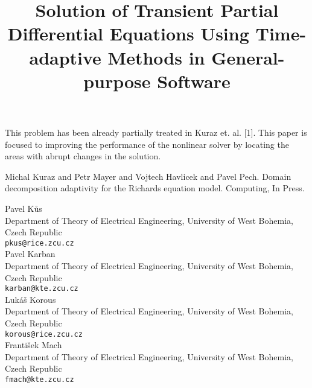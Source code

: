 \documentclass[article,A4,11pt]{llncs}%
\begin{document}
This problem has been already partially treated in Kuraz et. al. [1]. This paper is focused to improving the performance of the nonlinear solver by locating the areas with  abrupt changes in the solution.



\begin{thebibliography}{10}
{\sc Michal Kuraz and Petr Mayer and Vojtech Havlicek and Pavel Pech}. {Domain decomposition adaptivity for the Richards equation model}. Computing, In Press.
\end{thebibliography}

\title{Solution of Transient Partial Differential Equations Using Time-adaptive Methods in General-purpose Software}
 \author{} \institute{}
\maketitle
\begin{center}
{\large Pavel  Kůs}\\
Department of Theory of Electrical Engineering, University of West Bohemia, Czech Republic\\
{\tt pkus@rice.zcu.cz}
\\ \vspace{4mm}
{\large Pavel Karban}\\
Department of Theory of Electrical Engineering, University of West Bohemia, Czech Republic\\
{\tt karban@kte.zcu.cz}
\\ \vspace{4mm}
{\large Lukáš Korous}\\
Department of Theory of Electrical Engineering, University of West Bohemia, Czech Republic\\
{\tt korous@rice.zcu.cz}
\\ \vspace{4mm}
{\large František Mach}\\
Department of Theory of Electrical Engineering, University of West Bohemia, Czech Republic\\
{\tt fmach@kte.zcu.cz}
\end{center}
\end{document}
